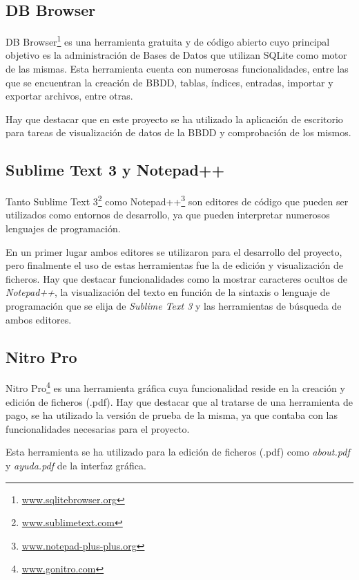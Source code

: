 \subsection{DB Browser}\label{db_browser}
DB Browser\footnote{\href{https://sqlitebrowser.org/}{www.sqlitebrowser.org}} es una herramienta gratuita y de código abierto cuyo principal objetivo es la administración de Bases de Datos que utilizan SQLite como motor de las mismas. Esta herramienta cuenta con numerosas funcionalidades, entre las que se encuentran la creación de BBDD, tablas, índices, entradas, importar y exportar archivos, entre otras.

Hay que destacar que en este proyecto se ha utilizado la aplicación de escritorio para tareas de visualización de datos de la BBDD y comprobación de los mismos.


\subsection{Sublime Text 3 y Notepad++}\label{sublime_text_3_y_notepad++}
Tanto Sublime Text 3\footnote{\href{https://www.sublimetext.com/}{www.sublimetext.com}} como Notepad++\footnote{\href{https://notepad-plus-plus.org/}{www.notepad-plus-plus.org}} son editores de código que pueden ser utilizados como entornos de desarrollo, ya que pueden interpretar numerosos lenguajes de programación. 

En un primer lugar ambos editores se utilizaron para el desarrollo del proyecto, pero finalmente el uso de estas herramientas fue la de edición y visualización de ficheros. Hay que destacar funcionalidades como la mostrar caracteres ocultos de \emph{Notepad++}, la visualización del texto en función de la sintaxis o lenguaje de programación que se elija de \emph{Sublime Text 3} y las herramientas de búsqueda de ambos editores.

\subsection{Nitro Pro}\label{nitro_pro}
Nitro Pro\footnote{\href{https://www.gonitro.com/es/}{www.gonitro.com}} es una herramienta gráfica cuya funcionalidad reside en la creación y edición de ficheros (.pdf). Hay que destacar que al tratarse de una herramienta de pago, se ha utilizado la versión de prueba de la misma, ya que contaba con las funcionalidades necesarias para el proyecto.

Esta herramienta se ha utilizado para la edición de ficheros (.pdf) como \emph{about.pdf} y \emph{ayuda.pdf} de la interfaz gráfica.

